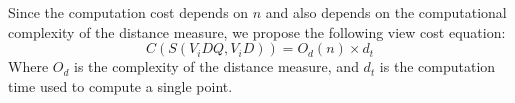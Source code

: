 %
Since the computation cost depends on $n$ and also 
depends on the computational complexity of the distance measure, we propose the following view cost equation:
\begin{equation}
\label{eq:cost_view_measure}
C( S(V_i DQ, V_i D)) = O_d( n ) \times d_t
\end{equation}
Where $O_d$ is the complexity of the distance measure, and $d_t$ is the computation time used to compute a single point.

